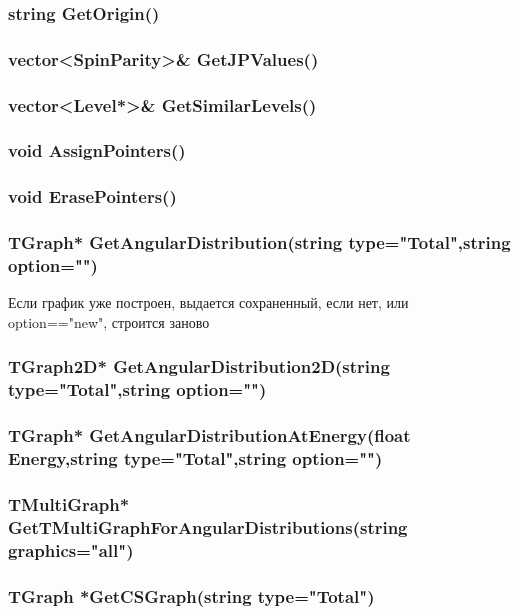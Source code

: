 \documentclass[a4paper,12pt]{extarticle}
\begin{document}
\subsubsection{string GetOrigin()} 

\subsubsection{vector<SpinParity>\textbf{\&} GetJPValues()}

\subsubsection{vector<Level*>\textbf{\&} GetSimilarLevels()}

\subsubsection{void AssignPointers()}

\subsubsection{void ErasePointers()}

\subsubsection{TGraph* GetAngularDistribution(string type="Total",string option="")}
Если график уже построен, выдается сохраненный, если нет, или option=="new", строится заново
\subsubsection{TGraph2D* GetAngularDistribution2D(string type="Total",string option="")}

\subsubsection{TGraph* GetAngularDistributionAtEnergy(float Energy,string type="Total",string option="")}

\subsubsection{TMultiGraph* GetTMultiGraphForAngularDistributions(string graphics="all")}

\subsubsection{TGraph *GetCSGraph(string type="Total")}
\end{document}
